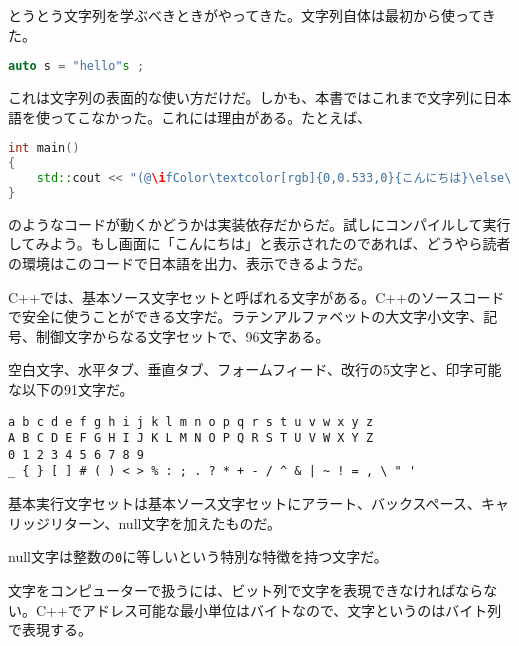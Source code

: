 

とうとう文字列を学ぶべきときがやってきた。文字列自体は最初から使ってきた。

\begin{lstlisting}[language={C++}]
auto s = "hello"s ;
\end{lstlisting}

これは文字列の表面的な使い方だけだ。しかも、本書ではこれまで文字列に日本語を使ってこなかった。これには理由がある。たとえば、
\begin{lstlisting}[language={C++}]
int main()
{
    std::cout << "(@\ifColor\textcolor[rgb]{0,0.533,0}{こんにちは}\else\textcolor{black}{こんにちは}\fi@)"s ;
}
\end{lstlisting}
のようなコードが動くかどうかは実装依存だからだ。試しにコンパイルして実行してみよう。もし画面に「こんにちは」と表示されたのであれば、どうやら読者の環境はこのコードで日本語を出力、表示できるようだ。


C++では、基本ソース文字セットと呼ばれる文字がある。C++のソースコードで安全に使うことができる文字だ。ラテンアルファベットの大文字小文字、記号、制御文字からなる文字セットで、96文字ある。

空白文字、水平タブ、垂直タブ、フォームフィード、改行の5文字と、印字可能な以下の91文字だ。

\begin{lstlisting}[style=grammar]
a b c d e f g h i j k l m n o p q r s t u v w x y z
A B C D E F G H I J K L M N O P Q R S T U V W X Y Z
0 1 2 3 4 5 6 7 8 9
_ { } [ ] # ( ) < > % : ; . ? * + - / ^ & | ~ ! = , \ " '
\end{lstlisting}


基本実行文字セットは基本ソース文字セットにアラート、バックスペース、キャリッジリターン、null文字を加えたものだ。

null文字は整数の\texttt{0}に等しいという特別な特徴を持つ文字だ。


文字をコンピューターで扱うには、ビット列で文字を表現できなければならない。C++でアドレス可能な最小単位はバイトなので、文字というのはバイト列で表現する。

